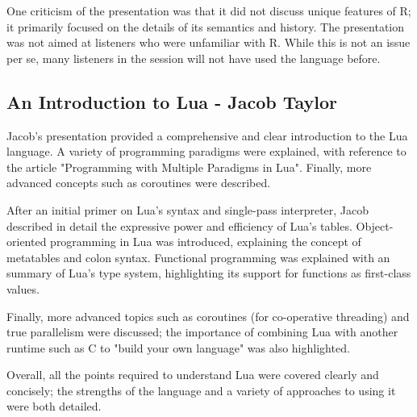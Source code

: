 \documentclass[11pt]{article}
\begin{document}
One criticism of the presentation was that it did not discuss unique features of R; it primarily focused on the details of its semantics and history. The presentation was not aimed at listeners who were unfamiliar with R. While this is not an issue per se, many listeners in the session will not have used the language before.
\subsection{An Introduction to Lua - Jacob Taylor}
\label{sec:orgb7eadc3}
Jacob's presentation provided a comprehensive and clear introduction to the Lua language. A variety of programming paradigms were explained, with reference to the article "Programming with Multiple Paradigms in Lua". Finally, more advanced concepts such as coroutines were described.

After an initial primer on Lua's syntax and single-pass interpreter, Jacob described in detail the expressive power and efficiency of Lua's tables. Object-oriented programming in Lua was introduced, explaining the concept of metatables and colon syntax. Functional programming was explained with an summary of Lua's type system, highlighting its support for functions as first-class values.

Finally, more advanced topics such as coroutines (for co-operative threading) and true parallelism were discussed; the importance of combining Lua with another runtime such as C to "build your own language" was also highlighted. 

Overall, all the points required to understand Lua were covered clearly and concisely; the strengths of the language and a variety of approaches to using it were both detailed.
\end{document}
